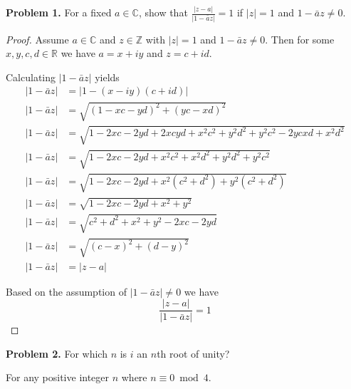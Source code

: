 \documentclass[letter,12pt]{article}
\date{\today}
\begin{document}
\pagestyle{fancy}
\begin{tcolorbox}
    \textbf{Problem 1.} For a fixed $a\in \mathbb{C}$, show that $\frac{|z-a|}{|1-\bar{a}z|}=1$ if $|z|=1$ and $1-\bar{a}z\not = 0$.

\end{tcolorbox}

\begin{proof}
    Assume $a\in \mathbb{C}$ and $z\in \mathbb{Z}$ with $|z|=1$ and $1-\bar{a}z\not = 0$. Then for some $x,y,c,d\in \mathbb{R}$ we have $a=x+iy$ and $z=c+id$.

    Calculating $|1-\bar{a}z|$ yields \begin{align}
        |1-\bar{a}z| & = |1-(x-iy)(c+id)|                                         \\
        |1-\bar{a}z| & = \sqrt{(1-xc-yd)^2+(yc-xd)^2}                             \\
        |1-\bar{a}z| & = \sqrt{1-2xc-2yd+2xcyd+x^2c^2+y^2d^2+y^2c^2-2ycxd+x^2d^2} \\
        |1-\bar{a}z| & =\sqrt{1-2xc-2yd+x^2c^2+x^2d^2+y^2d^2+y^2c^2}              \\
        |1-\bar{a}z| & =\sqrt{1-2xc-2yd+x^2(c^2+d^2)+y^2(c^2+d^2)}                \\
        |1-\bar{a}z| & =\sqrt{1-2xc-2yd+x^2+y^2}                                  \\
        |1-\bar{a}z| & =\sqrt{c^2+d^2+x^2+y^2-2xc-2yd}                            \\
        |1-\bar{a}z| & =\sqrt{(c-x)^2+(d-y)^2}                                    \\
        |1-\bar{a}z| & =|z-a|
    \end{align}

    Based on the assumption of $|1-\bar{a}z|\not = 0$ we have $$\frac{|z-a|}{|1-\bar{a}z|}=1$$

\end{proof}

\begin{tcolorbox}
    \textbf{Problem 2.} For which $n$ is $i$ an $n$th root of unity?
\end{tcolorbox}
For any positive integer $n$ where $n\equiv 0\bmod 4$.

\begin{tabbing}

\end{tabbing}
\end{document}
